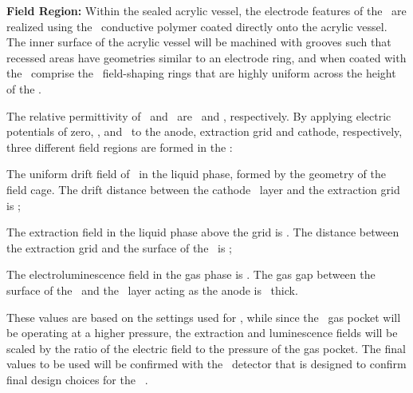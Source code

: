 {\bf Field Region:} Within the sealed acrylic vessel, the electrode features of the \TPC\ are realized using the \Clevios\ conductive polymer coated directly onto the acrylic vessel. The inner surface of the acrylic vessel will be machined with grooves such that recessed areas have geometries similar to an electrode ring, and when coated with the \Clevios\ comprise the \TPC\ field-shaping rings that are highly uniform across the height of the \TPC.  

The relative permittivity of \LAr\ and \GAr\ are \LArRelativePermittivity\ and \GArRelativePermittivity, respectively.  By applying electric potentials of zero, \DSkGridPotential, and \DSkCathodePotential\ to the anode, extraction grid and cathode, respectively, three different field regions are formed in the \TPC:

\begin{compactitem}
\item The uniform drift field of \DSkDriftField\ in the liquid phase, formed by the geometry of the field cage. The drift distance between the cathode \Clevios\ layer and the extraction grid is \DSkTPCHeight;
\item The extraction field in the liquid phase above the grid is \DSkExtractionField. The distance between the extraction grid and the surface of the \LAr\ is \DSkLArOverGridThickness;
\item The electroluminescence field in the gas phase is \DSkElectroLuminescenceField. The gas gap between the surface of the \LAr\ and the \Clevios\ layer acting as the anode is \DSkGasPocketThickness\ thick.
\end{compactitem}

These values are based on the settings used for \DSfs, while since the \DSks\ gas pocket will be operating at a higher pressure, the extraction and luminescence fields will be scaled by the ratio of the electric field to the pressure of the gas pocket. The final values to be used will be confirmed with the \DSps\ detector that is designed to confirm final design choices for the \DSks\ \LArTPC.

